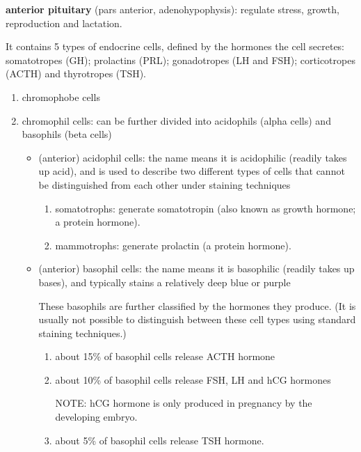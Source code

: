 {\bf anterior pituitary} (pars anterior, adenohypophysis):
regulate stress, growth, reproduction and lactation.
  
It contains 5 types of endocrine cells, defined by the
hormones the cell secretes: somatotropes (GH); prolactins (PRL); gonadotropes (LH and FSH);
corticotropes (ACTH) and thyrotropes (TSH). 
\begin{enumerate}
  \item  chromophobe cells 
  
  \item chromophil cells: can be further divided into acidophils (alpha cells)
  and basophils (beta cells)
  \begin{itemize}
    \item (anterior) acidophil cells: the name means it is acidophilic (readily
    takes up acid), and is used to describe two different types of cells that 
     cannot be distinguished from each other under staining techniques
     \begin{enumerate}
       \item somatotrophs: generate somatotropin (also known as growth hormone;
       a protein hormone).
       
       \item mammotrophs: generate prolactin (a protein hormone).
     \end{enumerate}
    
    \item (anterior) basophil cells: the name means  it is basophilic (readily
    takes up bases), and typically stains a relatively deep blue or purple
    
    These basophils are further classified by the hormones they produce. (It is
    usually not possible to distinguish between these cell types using standard
    staining techniques.) 
    \begin{enumerate}
      \item about 15\% of basophil cells release ACTH hormone
      \item about 10\% of basophil cells release FSH, LH and hCG hormones
      
      NOTE: hCG hormone is only produced in pregnancy by the developing
      embryo.
      
      \item about 5\% of basophil cells release TSH hormone.
    \end{enumerate}
  \end{itemize}
\end{enumerate}

